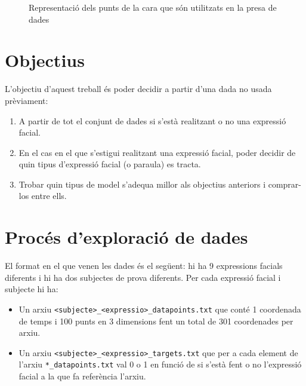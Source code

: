 \documentclass[a4paper]{article}
\begin{document}
\begin{figure}[H]
	\centering
	\caption{Representació dels punts de la cara que són utilitzats en la presa de dades}
\end{figure}

\section{Objectius}

L'objectiu d'aquest treball és poder decidir a partir d'una dada no usada prèviament:
\begin{enumerate}
	\item A partir de tot el conjunt de dades si s'està realitzant o no una expressió facial.
	\item En el cas en el que s'estigui realitzant una expressió facial, poder decidir de quin tipus d'expressió facial (o paraula) es tracta.
	\item Trobar quin tipus de model s'adequa millor als objectius anteriors i comprar-los entre ells.
\end{enumerate}

\section{Procés d'exploració de dades}

El format en el que venen les dades és el següent: hi ha 9 expressions facials diferents i hi ha dos subjectes de prova diferents. Per cada expressió facial i subjecte hi ha:
\begin{itemize}
	\item Un arxiu \verb|<subjecte>_<expressio>_datapoints.txt| que conté 1 coordenada de temps i 100 punts en 3 dimensions fent un total de 301 coordenades per arxiu.
	\item Un arxiu \verb|<subjecte>_<expressio>_targets.txt| que per a cada element de l'arxiu \verb|*_datapoints.txt| val 0 o 1 en funció de si s'està fent o no l'expressió facial a la que fa referència l'arxiu.
\end{itemize}
\end{document}
